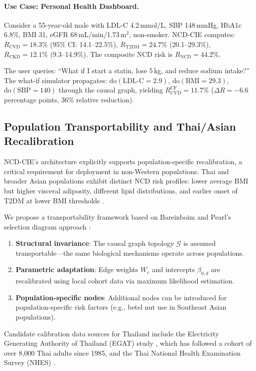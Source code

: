 \documentclass[runningheads]{llncs}
\begin{document}
\paragraph{Use Case: Personal Health Dashboard.}
Consider a 55-year-old male with LDL-C 4.2\,mmol/L, SBP 148\,mmHg,
HbA1c 6.8\%, BMI 31, eGFR 68\,mL/min/1.73\,m$^2$, non-smoker.
NCD-CIE computes: $R_{\text{CVD}} = 18.3\%$ (95\% CI: 14.1--22.5\%),
$R_{\text{T2DM}} = 24.7\%$ (20.1--29.3\%), $R_{\text{CKD}} = 12.1\%$
(9.3--14.9\%).  The composite NCD risk is $R_{\text{NCD}} = 44.2\%$.

The user queries: ``What if I start a statin, lose 5\,kg, and reduce
sodium intake?''  The what-if simulator propagates:
$\mathrm{do}(\text{LDL-C} = 2.9)$, $\mathrm{do}(\text{BMI} = 29.3)$,
$\mathrm{do}(\text{SBP} = 140)$ through the causal graph, yielding
$R_{\text{CVD}}^{\text{CF}} = 11.7\%$ ($\Delta R = -6.6$ percentage
points, 36\% relative reduction).

\subsection{Population Transportability and Thai/Asian Recalibration}
\label{sec:thai}

NCD-CIE's architecture explicitly supports population-specific
recalibration, a critical requirement for deployment in non-Western
populations.  Thai and broader Asian populations exhibit distinct NCD
risk profiles: lower average BMI but higher visceral adiposity,
different lipid distributions, and earlier onset of T2DM at lower BMI
thresholds \cite{aekplakorn2011thai}.

We propose a transportability framework based on Bareinboim and
Pearl's selection diagram approach \cite{bareinboim2016causal}:
\begin{enumerate}
\item \textbf{Structural invariance}: The causal graph topology
  $\mathcal{G}$ is assumed transportable---the same biological
  mechanisms operate across populations.
\item \textbf{Parametric adaptation}: Edge weights $W_e$ and
  intercepts $\beta_{0,d}$ are recalibrated using local cohort data
  via maximum likelihood estimation.
\item \textbf{Population-specific nodes}: Additional nodes can be
  introduced for population-specific risk factors (e.g., betel nut
  use in Southeast Asian populations).
\end{enumerate}

Candidate calibration data sources for Thailand include the
Electricity Generating Authority of Thailand (EGAT) study
\cite{sritara2003egat}, which has followed a cohort of over 8{,}000
Thai adults since 1985, and the Thai National Health Examination
Survey (NHES) \cite{aekplakorn2011thai}.
\end{document}

